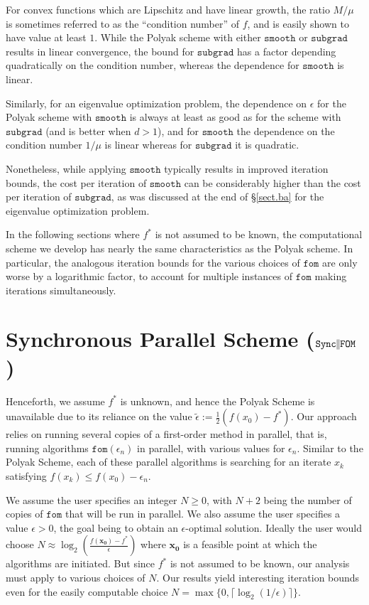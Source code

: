 \documentclass[reqno, 11pt]{amsart}
\numberwithin{equation}{section}
\newcommand{\nt}{\negthinspace}
\newcommand{\fom}{\mathtt{fom}}
\newcommand{\parfom}{\parallel \nt \nt  \mathtt{FOM}}
\newcommand{\subgrad}{\mathtt{subgrad}}
\newcommand{\smooth}{\mathtt{smooth}}
\newcommand{\sparfom}{\mathtt{Sync} \nt \nt  \parfom}
\begin{document}
For convex functions which are Lipschitz and have linear growth, the ratio $ M/\mu $ is sometimes referred to as the ``condition number'' of $ f $, and is easily shown to have value at least $ 1 $. While the Polyak scheme with either $ \smooth $ or $ \subgrad $ results in linear convergence, the bound for $ \subgrad $ has a factor depending quadratically on the condition number, whereas the dependence for $ \smooth $ is linear. 

Similarly, for an eigenvalue optimization problem, the dependence on $ \epsilon $ for the Polyak scheme with $ \smooth $ is always at least as good as for the scheme with $ \subgrad $ (and is better  when $ d > 1 $), and for $ \smooth $ the dependence on the condition number $ 1/\mu $ is linear whereas for $ \subgrad $ it is quadratic.

Nonetheless, while applying $ \smooth $ typically results in improved iteration bounds, the cost per iteration of $ \smooth $ can be considerably higher than the cost per iteration of $ \subgrad $, as was discussed at the end of \S\ref{sect.ba}  for the eigenvalue optimization problem.

In the following sections where $ f^* $ is not assumed to be known, the computational scheme we develop has nearly the same characteristics as the Polyak scheme. In particular, the analogous iteration bounds for the various choices of $ \fom $ are only worse by a logarithmic factor, to account for multiple instances of $ \fom $ making iterations simultaneously.

\section{{\bf Synchronous Parallel Scheme ($ \sparfom $)}} \label{sect.d} 
Henceforth, we assume $ f^* $ is unknown, and hence the Polyak Scheme is unavailable due to its reliance on the value $ \tilde{\epsilon } :=  \frac{1}{2}( f(x_0) - f^*) $. Our approach relies on running several copies of a first-order method in parallel, that is, running algorithms $ \fom( \epsilon_n) $ in parallel, with various values for $ \epsilon_n $. Similar to the Polyak Scheme, each of these parallel algorithms is searching for an iterate $x_k$ satisfying $f(x_k) \leq f(x_0) - \epsilon_n $.

We assume the user specifies an integer $ N \geq 0 $, with $ N + 2 $ being the number of copies of $ \fom $ that will be run in parallel. We also assume the user specifies a value $ \epsilon > 0 $, the goal being to obtain an $ \epsilon $-optimal solution. Ideally the user would choose $ N \approx \log_2 ( \frac{f( \mathbf{x_0}) - f^*}{ \epsilon} )$ where $  \mathbf{x_0} $ is a feasible point at which the algorithms are initiated. But since $ f^* $ is not assumed to be known, our analysis must apply to various choices of $ N $. Our results yield interesting iteration bounds even for the easily computable choice $ N = \max \{ 0, \lceil   \log_2(1/\epsilon) \rceil \} $.   
\end{document}
